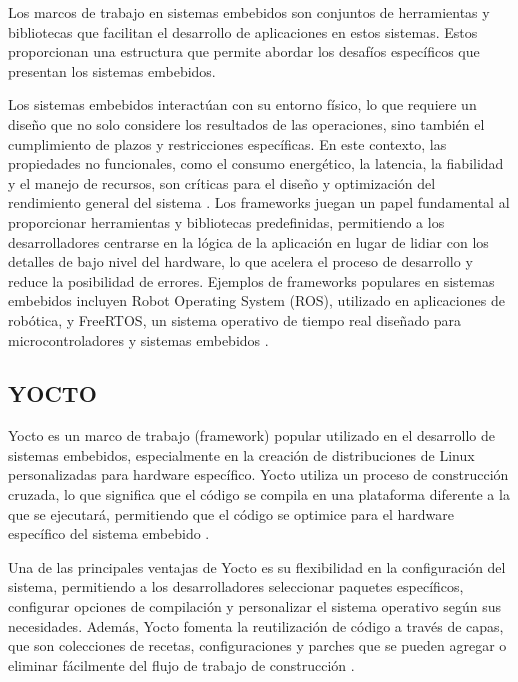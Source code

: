 Los marcos de trabajo en sistemas embebidos son conjuntos de herramientas y bibliotecas que facilitan el desarrollo de aplicaciones en estos 
sistemas. Estos proporcionan una estructura que permite abordar los desafíos específicos que presentan los sistemas embebidos.

Los sistemas embebidos interactúan con su entorno físico, lo que requiere un diseño que no solo considere los resultados de las operaciones, 
sino también el cumplimiento de plazos y restricciones específicas. En este contexto, las propiedades no funcionales, como el consumo energético, 
la latencia, la fiabilidad y el manejo de recursos, son críticas para el diseño y optimización del rendimiento general del sistema \cite{Marugn2017SimulacinYV}. Los frameworks 
juegan un papel fundamental al proporcionar herramientas y bibliotecas predefinidas, permitiendo a los desarrolladores centrarse en la lógica de la 
aplicación en lugar de lidiar con los detalles de bajo nivel del hardware, lo que acelera el proceso de desarrollo y reduce la posibilidad de errores. 
Ejemplos de frameworks populares en sistemas embebidos incluyen Robot Operating System (ROS), utilizado en aplicaciones de robótica, y FreeRTOS, 
un sistema operativo de tiempo real diseñado para microcontroladores y sistemas embebidos \cite{HerreraLpez2023EntornoDT}.

\subsection{YOCTO}

Yocto es un marco de trabajo (framework) popular utilizado en el desarrollo de sistemas embebidos, especialmente en la creación de distribuciones de Linux 
personalizadas para hardware específico. Yocto utiliza un proceso de construcción cruzada, lo que significa que el código se compila en una plataforma diferente 
a la que se ejecutará, permitiendo que el código se optimice para el hardware específico del sistema embebido \cite{Leppakoski2013FrameworkFI}.

Una de las principales ventajas de Yocto es su flexibilidad en la configuración del sistema, permitiendo a los desarrolladores seleccionar paquetes específicos, 
configurar opciones de compilación y personalizar el sistema operativo según sus necesidades. Además, Yocto fomenta la reutilización de código a través de capas, 
que son colecciones de recetas, configuraciones y parches que se pueden agregar o eliminar fácilmente del flujo de trabajo de construcción \cite{Leppakoski2013FrameworkFI}.

